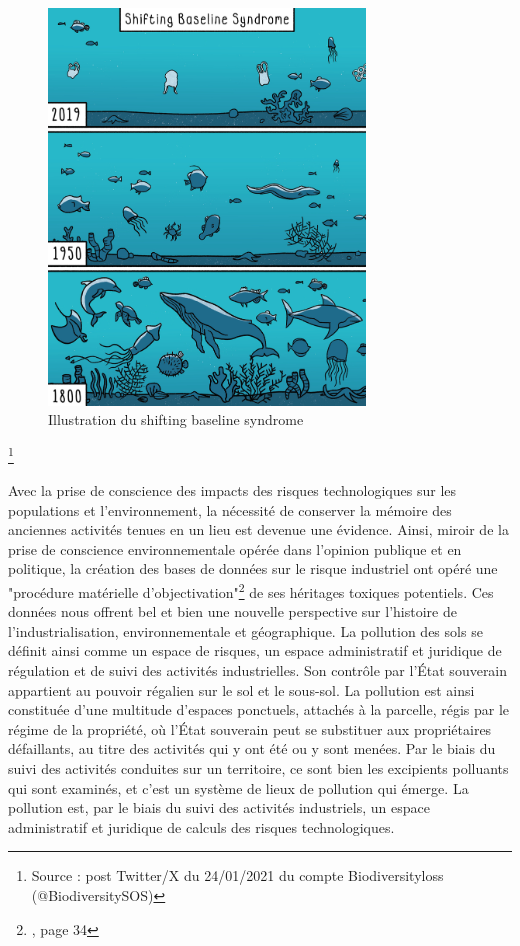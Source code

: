 \documentclass[a4paper,twoside,12pt]{book}
\begin{document}
\vspace{1em} 
\begin{figure}[!h]
\centering 
\includegraphics[width=0.75\textwidth]{img/chapitre2/shifting_baseline_syndrome.jpeg}
\caption{Illustration du shifting baseline syndrome}
\end{figure}\footnote{Source : post Twitter/X du 24/01/2021 du compte Biodiversityloss (@BiodiversitySOS)}

Avec la prise de conscience des impacts des risques technologiques sur les populations et l’environnement, la nécessité de conserver la mémoire des anciennes activités tenues en un lieu est devenue une évidence. Ainsi, miroir de la prise de conscience environnementale opérée dans l'opinion publique et en politique, la création des bases de données sur le risque industriel ont opéré une "procédure matérielle d'objectivation"\footnote{\cite{desrosieres_politique_2010}, page 34} de ses héritages toxiques potentiels. Ces données nous offrent bel et bien une nouvelle perspective sur l'histoire de l'industrialisation, environnementale et géographique. La pollution des sols se définit ainsi comme un espace de risques, un espace administratif et juridique de régulation et de suivi des activités industrielles. Son contrôle par l’État souverain appartient au pouvoir régalien sur le sol et le sous-sol. La pollution est ainsi constituée d’une multitude d’espaces ponctuels, attachés à la parcelle, régis par le régime de la propriété, où l’État souverain peut se substituer aux propriétaires défaillants, au titre des activités qui y ont été ou y sont menées. Par le biais du suivi des activités conduites sur un territoire, ce sont bien les excipients polluants qui sont examinés, et c’est un système de lieux de pollution qui émerge. La pollution est, par le biais du suivi des activités industriels, un espace administratif et juridique de calculs des risques technologiques. 
\end{document}
